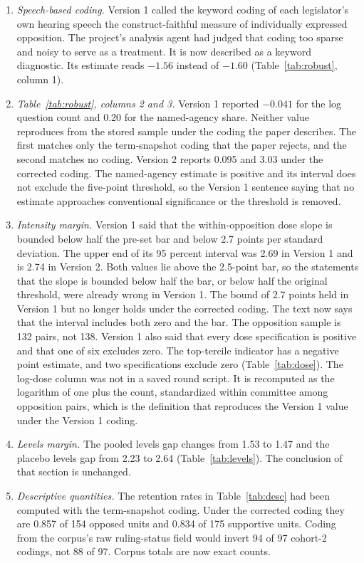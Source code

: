 \documentclass[11pt]{article}
\begin{document}
\begin{enumerate}
\item \textit{Speech-based coding.} Version 1 called the keyword coding of each legislator's own hearing speech the construct-faithful measure of individually expressed opposition. The project's analysis agent had judged that coding too sparse and noisy to serve as a treatment. It is now described as a keyword diagnostic. Its estimate reads $-1.56$ instead of $-1.60$ (Table~\ref{tab:robust}, column 1).
\item \textit{Table~\ref{tab:robust}, columns 2 and 3.} Version 1 reported $-0.041$ for the log question count and 0.20 for the named-agency share. Neither value reproduces from the stored sample under the coding the paper describes. The first matches only the term-snapshot coding that the paper rejects, and the second matches no coding. Version 2 reports 0.095 and 3.03 under the corrected coding. The named-agency estimate is positive and its interval does not exclude the five-point threshold, so the Version 1 sentence saying that no estimate approaches conventional significance or the threshold is removed.
\item \textit{Intensity margin.} Version 1 said that the within-opposition dose slope is bounded below half the pre-set bar and below 2.7 points per standard deviation. The upper end of its 95 percent interval was 2.69 in Version 1 and is 2.74 in Version 2. Both values lie above the 2.5-point bar, so the statements that the slope is bounded below half the bar, or below half the original threshold, were already wrong in Version 1. The bound of 2.7 points held in Version 1 but no longer holds under the corrected coding. The text now says that the interval includes both zero and the bar. The opposition sample is 132 pairs, not 138. Version 1 also said that every dose specification is positive and that one of six excludes zero. The top-tercile indicator has a negative point estimate, and two specifications exclude zero (Table~\ref{tab:dose}). The log-dose column was not in a saved round script. It is recomputed as the logarithm of one plus the count, standardized within committee among opposition pairs, which is the definition that reproduces the Version 1 value under the Version 1 coding.
\item \textit{Levels margin.} The pooled levels gap changes from 1.53 to 1.47 and the placebo levels gap from 2.23 to 2.64 (Table~\ref{tab:levels}). The conclusion of that section is unchanged.
\item \textit{Descriptive quantities.} The retention rates in Table~\ref{tab:desc} had been computed with the term-snapshot coding. Under the corrected coding they are 0.857 of 154 opposed units and 0.834 of 175 supportive units. Coding from the corpus's raw ruling-status field would invert 94 of 97 cohort-2 codings, not 88 of 97. Corpus totals are now exact counts.

\end{enumerate}
\end{document}
